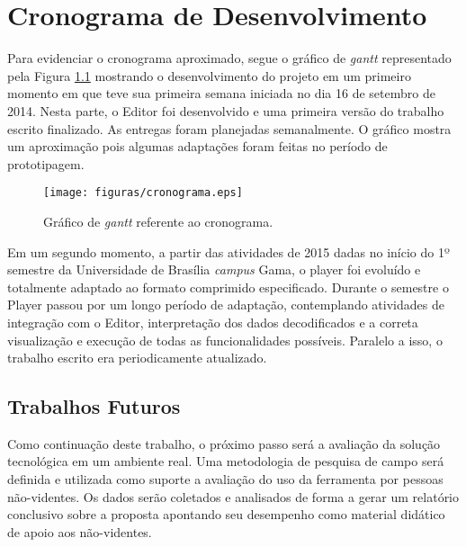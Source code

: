 \chapter[Cronograma de Desenvolvimento]{Cronograma de Desenvolvimento}\label{cap5}

Para evidenciar o cronograma aproximado, segue o gráfico de \textit{gantt} representado pela Figura \ref{cronograma} mostrando o desenvolvimento do projeto em um primeiro momento em que teve sua primeira semana iniciada no dia 16 de setembro de 2014. Nesta parte, o Editor foi desenvolvido e uma primeira versão do trabalho escrito finalizado. As entregas foram planejadas semanalmente. O gráfico mostra um aproximação pois algumas adaptações foram feitas no período de prototipagem.


 \begin{figure}[ht]
	\centering
		\texttt{[image: figuras/cronograma.eps]}
	\caption{Gráfico de \textit{gantt} referente ao cronograma.}
	\label{cronograma}
\end{figure}

Em um segundo momento, a partir das atividades de 2015 dadas no início do 1º semestre da Universidade de Brasília \textit{campus} Gama, o player foi evoluído e totalmente adaptado ao formato comprimido especificado. Durante o semestre o Player passou por um longo período de adaptação, contemplando atividades de integração com o Editor, interpretação dos dados  decodificados e a correta visualização e execução de todas as funcionalidades possíveis. Paralelo a isso, o trabalho escrito era periodicamente atualizado.

\section{Trabalhos Futuros}

Como continuação deste trabalho, o próximo passo será a avaliação da solução tecnológica em um ambiente real. Uma metodologia de pesquisa de campo será definida e utilizada como suporte a avaliação do uso da ferramenta por pessoas não-videntes. Os dados serão coletados e analisados de forma a gerar um relatório conclusivo sobre a proposta apontando seu desempenho como material didático de apoio aos não-videntes.